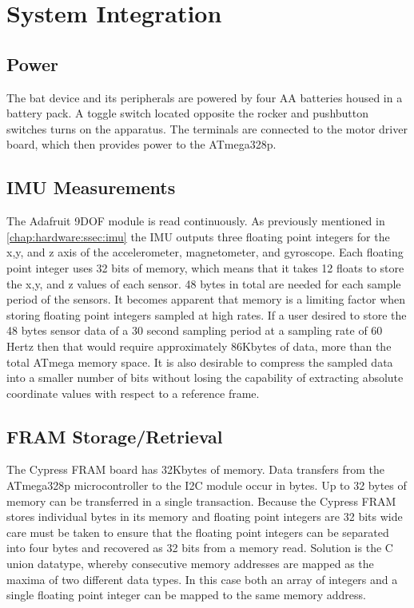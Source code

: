 \chapter{System Integration}
\label{chap:sysint}

\section{Power}

The bat device and its peripherals are powered by four AA batteries housed in a battery pack.  A toggle switch located opposite the rocker and pushbutton switches turns on the apparatus.  The terminals are connected to the motor driver board, which then provides power to the ATmega328p.

\section{IMU Measurements}

The Adafruit 9DOF module is read continuously.  As previously mentioned in \autoref{chap:hardware:ssec:imu} the IMU outputs three floating point integers for the x,y, and z axis of the accelerometer, magnetometer, and gyroscope.  Each floating point integer uses 32 bits of memory, which means that it takes 12 floats to store the x,y, and z values of each sensor.  48 bytes in total are needed for each sample period of the sensors.  It becomes apparent that memory is a limiting factor when storing floating point integers sampled at high rates.  If a user desired to store the 48 bytes sensor data of a 30 second sampling period at a sampling rate of 60 Hertz then that would require approximately 86Kbytes of data, more than the total ATmega memory space.  It is also desirable to compress the sampled data into a smaller number of bits without losing the capability of extracting absolute coordinate values with respect to a reference frame.


\section{FRAM Storage/Retrieval}

The Cypress FRAM board has 32Kbytes of memory.  Data transfers from the ATmega328p microcontroller to the I2C module occur in bytes.  Up to 32 bytes of memory can be transferred in a single transaction.  Because the Cypress FRAM stores individual bytes in its memory and floating point integers are 32 bits wide care must be taken to ensure that the floating point integers can be separated into four bytes and recovered as 32 bits from a memory read.  Solution is the C union datatype, whereby consecutive memory addresses are mapped as the maxima of two different data types. In this case both an array of integers and a single floating point integer can be mapped to the same memory address.

